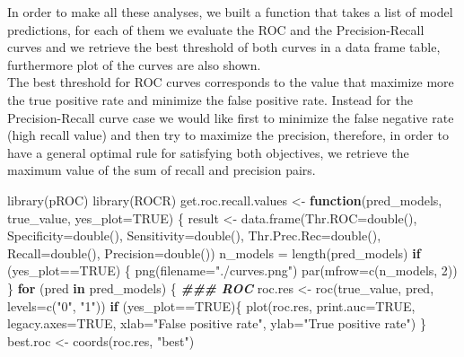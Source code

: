 \documentclass[
]{article}
\newenvironment{Shaded}{\begin{snugshade}}{\end{snugshade}}
\newcommand{\AttributeTok}[1]{\textcolor[rgb]{0.77,0.63,0.00}{#1}}
\newcommand{\ConstantTok}[1]{\textcolor[rgb]{0.00,0.00,0.00}{#1}}
\newcommand{\ControlFlowTok}[1]{\textcolor[rgb]{0.13,0.29,0.53}{\textbf{#1}}}
\newcommand{\DecValTok}[1]{\textcolor[rgb]{0.00,0.00,0.81}{#1}}
\newcommand{\DocumentationTok}[1]{\textcolor[rgb]{0.56,0.35,0.01}{\textbf{\textit{#1}}}}
\newcommand{\FunctionTok}[1]{\textcolor[rgb]{0.00,0.00,0.00}{#1}}
\newcommand{\NormalTok}[1]{#1}
\newcommand{\OtherTok}[1]{\textcolor[rgb]{0.56,0.35,0.01}{#1}}
\newcommand{\SpecialCharTok}[1]{\textcolor[rgb]{0.00,0.00,0.00}{#1}}
\newcommand{\StringTok}[1]{\textcolor[rgb]{0.31,0.60,0.02}{#1}}
\begin{document}
In order to make all these analyses, we built a function that takes a
list of model predictions, for each of them we evaluate the ROC and the
Precision-Recall curves and we retrieve the best threshold of both
curves in a data frame table, furthermore plot of the curves are also
shown.\\
The best threshold for ROC curves corresponds to the value that maximize
more the true positive rate and minimize the false positive rate.
Instead for the Precision-Recall curve case we would like first to
minimize the false negative rate (high recall value) and then try to
maximize the precision, therefore, in order to have a general optimal
rule for satisfying both objectives, we retrieve the maximum value of
the sum of recall and precision pairs.

\begin{Shaded}
\begin{Highlighting}[]
\FunctionTok{library}\NormalTok{(pROC)}
\FunctionTok{library}\NormalTok{(ROCR)}
\NormalTok{get.roc.recall.values }\OtherTok{\textless{}{-}} \ControlFlowTok{function}\NormalTok{(pred\_models, true\_value, }\AttributeTok{yes\_plot=}\ConstantTok{TRUE}\NormalTok{) \{}
\NormalTok{  result }\OtherTok{\textless{}{-}} \FunctionTok{data.frame}\NormalTok{(}\AttributeTok{Thr.ROC=}\FunctionTok{double}\NormalTok{(), }\AttributeTok{Specificity=}\FunctionTok{double}\NormalTok{(), }\AttributeTok{Sensitivity=}\FunctionTok{double}\NormalTok{(),}
                       \AttributeTok{Thr.Prec.Rec=}\FunctionTok{double}\NormalTok{(), }\AttributeTok{Recall=}\FunctionTok{double}\NormalTok{(), }\AttributeTok{Precision=}\FunctionTok{double}\NormalTok{())}
\NormalTok{  n\_models }\OtherTok{=} \FunctionTok{length}\NormalTok{(pred\_models)}
  \ControlFlowTok{if}\NormalTok{ (yes\_plot}\SpecialCharTok{==}\ConstantTok{TRUE}\NormalTok{) \{}
    \FunctionTok{png}\NormalTok{(}\AttributeTok{filename=}\StringTok{"./curves.png"}\NormalTok{)}
    \FunctionTok{par}\NormalTok{(}\AttributeTok{mfrow=}\FunctionTok{c}\NormalTok{(n\_models, }\DecValTok{2}\NormalTok{))}
\NormalTok{  \}}
  \ControlFlowTok{for}\NormalTok{ (pred }\ControlFlowTok{in}\NormalTok{ pred\_models) \{}
    \DocumentationTok{\#\#\# ROC}
\NormalTok{    roc.res }\OtherTok{\textless{}{-}} \FunctionTok{roc}\NormalTok{(true\_value, pred, }\AttributeTok{levels=}\FunctionTok{c}\NormalTok{(}\StringTok{"0"}\NormalTok{, }\StringTok{"1"}\NormalTok{))}
    \ControlFlowTok{if}\NormalTok{ (yes\_plot}\SpecialCharTok{==}\ConstantTok{TRUE}\NormalTok{)\{}
      \FunctionTok{plot}\NormalTok{(roc.res, }\AttributeTok{print.auc=}\ConstantTok{TRUE}\NormalTok{, }\AttributeTok{legacy.axes=}\ConstantTok{TRUE}\NormalTok{, }\AttributeTok{xlab=}\StringTok{"False positive rate"}\NormalTok{,}
                \AttributeTok{ylab=}\StringTok{"True positive rate"}\NormalTok{)}
\NormalTok{    \}}
\NormalTok{    best.roc  }\OtherTok{\textless{}{-}} \FunctionTok{coords}\NormalTok{(roc.res, }\StringTok{"best"}\NormalTok{)}
    

\end{Highlighting}
\end{Shaded}
\end{document}
